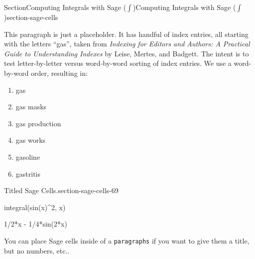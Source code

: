 \documentclass[twoside,10pt,]{article}
\newcommand{\mono}[1]{\texttt{#1}}
\newcommand{\pubtitle}[1]{\textsl{#1}}
\numberwithin{equation}{section}
\begin{document}
\begin{sectionptx}{Section}{Computing Integrals with Sage (\(\int\))}{}{Computing Integrals with Sage (\(\int\))}{}{}{section-sage-cells}
\par
This paragraph is just a placeholder.  It has handful of index entries, all starting with the letters ``gas'', taken from \pubtitle{Indexing for Editors and Authors: A Practical Guide to Understanding Indexes} by Leise, Mertes, and Badgett.  The intent is to test letter-by-letter versus word-by-word sorting of index entries.  We use a word-by-word order, resulting in:%
\begin{enumerate}
\item{}gas%
\item{}gas masks%
\item{}gas production%
\item{}gas works%
\item{}gasoline%
\item{}gastritis%
\end{enumerate}
%
\begin{paragraphs}{Titled Sage Cells.}{section-sage-cells-69}%
%
\begin{sageinput}
integral(sin(x)^2, x)
\end{sageinput}
\begin{sageoutput}
1/2*x - 1/4*sin(2*x)
\end{sageoutput}
You can place Sage cells inside of a \mono{paragraphs} if you want to give them a title, but no numbers, etc.\@.%
\end{paragraphs}%
\end{sectionptx}
%
%
\typeout{************************************************}
\typeout{************************************************}
%
\end{document}
